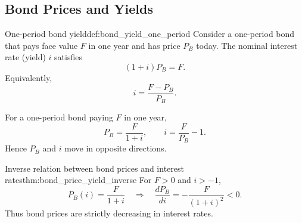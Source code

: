 \subsection{Bond Prices and Yields}

\begin{definition}{One-period bond yield}{def:bond_yield_one_period}
Consider a one-period bond that pays face value $F$ in one year and has price $P_B$ today.
The nominal interest rate (yield) $i$ satisfies
\[
(1+i)P_B = F.
\]
Equivalently,
\[
i = \frac{F-P_B}{P_B}.
\]
\end{definition}

\begin{keyformula}[title={Key Formula: Price--yield inversion}]
For a one-period bond paying $F$ in one year,
\[
P_B = \frac{F}{1+i},
\qquad
i = \frac{F}{P_B}-1.
\]
Hence $P_B$ and $i$ move in opposite directions.
\end{keyformula}

\begin{theorem}{Inverse relation between bond prices and interest rates}{thm:bond_price_yield_inverse}
For $F>0$ and $i>-1$,
\[
P_B(i)=\frac{F}{1+i}
\quad\Longrightarrow\quad
\frac{dP_B}{di}=-\frac{F}{(1+i)^2}<0.
\]
Thus bond prices are strictly decreasing in interest rates.
\end{theorem}

